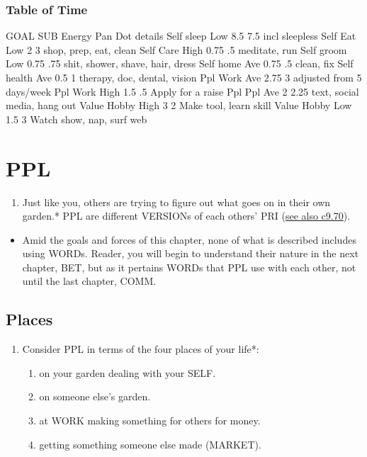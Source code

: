 \documentclass[
]{book}
\providecommand{\tightlist}{%
  \setlength{\itemsep}{0pt}\setlength{\parskip}{0pt}}
\begin{document}
\hypertarget{table-of-time}{%
\subsection{Table of Time}\label{table-of-time}}

GOAL SUB Energy Pan Dot details
Self sleep Low 8.5 7.5 incl sleepless
Self Eat Low 2 3 shop, prep, eat, clean
Self Care High 0.75 .5 meditate, run
Self groom Low 0.75 .75 shit, shower, shave, hair, dress
Self home Ave 0.75 .5 clean, fix
Self health Ave 0.5 1 therapy, doc, dental, vision
Ppl Work Ave 2.75 3 adjusted from 5 days/week
Ppl Work High 1.5 .5 Apply for a raise
Ppl Ppl Ave 2 2.25 text, social media, hang out
Value Hobby High 3 2 Make tool, learn skill
Value Hobby Low 1.5 3 Watch show, nap, surf web

\hypertarget{ppl}{%
\chapter{PPL}\label{ppl}}

\begin{enumerate}
\def\labelenumi{\arabic{enumi}.}
\tightlist
\item
  Just like you, others are trying to figure out what goes on in their own garden.* PPL are different VERSIONs of each others' PRI (\protect\hyperlink{norms-style}{see also c9.70}).
\end{enumerate}

\begin{itemize}
\tightlist
\item
  Amid the goals and forces of this chapter, none of what is described includes using WORDs. Reader, you will begin to understand their nature in the next chapter, BET, but as it pertains WORDs that PPL use with each other, not until the last chapter, COMM.
\end{itemize}

\hypertarget{places}{%
\section{Places}\label{places}}

\begin{enumerate}
\def\labelenumi{\arabic{enumi}.}
\setcounter{enumi}{1}
\tightlist
\item
  Consider PPL in terms of the four places of your life*:

  \begin{enumerate}
  \def\labelenumii{\arabic{enumii}.}
  \tightlist
  \item
    on your garden dealing with your SELF.
  \item
    on someone else's garden.
  \item
    at WORK making something for others for money.
  \item
    getting something someone else made (MARKET).
  \end{enumerate}
\end{enumerate}
\end{document}
